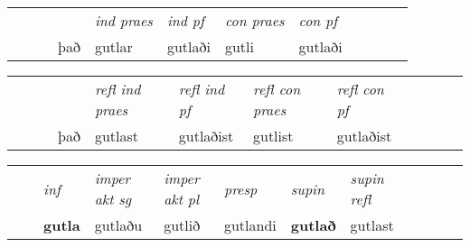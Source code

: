 \begin{tabular}{llllllllllll}
 & &  & &  \textit{ind praes} & \textit{ind pf} & \textit{con praes} & \textit{con pf} \\*
&  & & það & gutlar & gutlaði & gutli & gutlaði \\*
\cmidrule{5-9}
\end{tabular}


\begin{tabular}{llllllllllll}
 & &  & &  \textit{refl ind praes} & \textit{refl ind pf} & \textit{refl con praes} & \textit{refl con pf} \\*
 & &  & það & gutlast & gutlaðist & gutlist & gutlaðist \\*
\cmidrule{5-9}
\end{tabular}


\begin{tabular}{llllllllllll}
 & & \textit{inf} & \textit{imper akt sg} & \textit{imper akt pl}   & \textit{presp} & \textit{supin} & \textit{supin refl}      \\*
  & & \textbf{gutla} & gutlaðu  & gutlið   & gutlandi &  \textbf{gutlað} & gutlast  \\*
\cmidrule{1-12}
\end{tabular}



